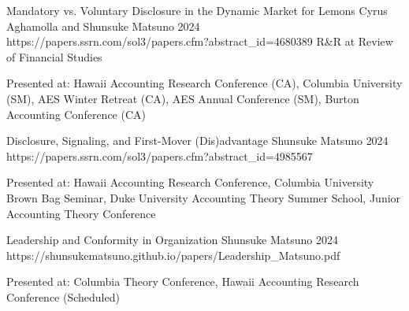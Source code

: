 


\paperentry
	{Mandatory vs. Voluntary Disclosure in the Dynamic Market for Lemons}   %
	{Cyrus Aghamolla and Shunsuke Matsuno}   %
	{2024}   %
	{https://papers.ssrn.com/sol3/papers.cfm?abstract_id=4680389}  %
	{}   %
	{R\&R at Review of Financial Studies}   %
	{
	\begin{cvitems}  %
		\item {Presented at: Hawaii Accounting Research Conference (CA), Columbia University (SM), AES Winter Retreat (CA), AES Annual Conference (SM), Burton Accounting Conference (CA)}			
	\end{cvitems}
	}

\paperentry
	{Disclosure, Signaling, and First-Mover (Dis)advantage}   %
	{Shunsuke Matsuno}   %
	{2024}
	{https://papers.ssrn.com/sol3/papers.cfm?abstract_id=4985567}  %
	{}   %
	{}   %
	{
	\begin{cvitems}  %
		\item {Presented at: Hawaii Accounting Research Conference, Columbia University Brown Bag Seminar, Duke University Accounting Theory Summer School, Junior Accounting Theory Conference}
	\end{cvitems}
	}

\paperentry
	{Leadership and Conformity in Organization}
	{Shunsuke Matsuno}
	{2024}
	{https://shunsukematsuno.github.io/papers/Leadership_Matsuno.pdf}
	{}
	{}
	{
	\begin{cvitems} %
		\item {Presented at: Columbia Theory Conference, Hawaii Accounting Research Conference (Scheduled)}
	\end{cvitems}
	}

\vspace{.3cm}


